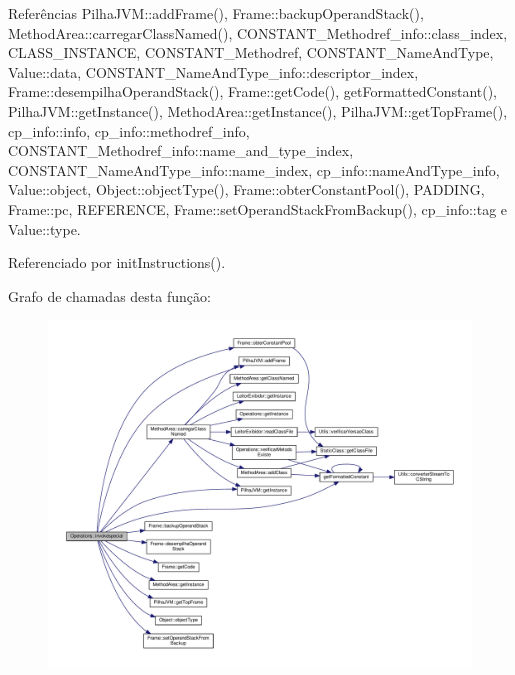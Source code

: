 Referências Pilha\+J\+V\+M\+::add\+Frame(), Frame\+::backup\+Operand\+Stack(), Method\+Area\+::carregar\+Class\+Named(), C\+O\+N\+S\+T\+A\+N\+T\+\_\+\+Methodref\+\_\+info\+::class\+\_\+index, C\+L\+A\+S\+S\+\_\+\+I\+N\+S\+T\+A\+N\+CE, C\+O\+N\+S\+T\+A\+N\+T\+\_\+\+Methodref, C\+O\+N\+S\+T\+A\+N\+T\+\_\+\+Name\+And\+Type, Value\+::data, C\+O\+N\+S\+T\+A\+N\+T\+\_\+\+Name\+And\+Type\+\_\+info\+::descriptor\+\_\+index, Frame\+::desempilha\+Operand\+Stack(), Frame\+::get\+Code(), get\+Formatted\+Constant(), Pilha\+J\+V\+M\+::get\+Instance(), Method\+Area\+::get\+Instance(), Pilha\+J\+V\+M\+::get\+Top\+Frame(), cp\+\_\+info\+::info, cp\+\_\+info\+::methodref\+\_\+info, C\+O\+N\+S\+T\+A\+N\+T\+\_\+\+Methodref\+\_\+info\+::name\+\_\+and\+\_\+type\+\_\+index, C\+O\+N\+S\+T\+A\+N\+T\+\_\+\+Name\+And\+Type\+\_\+info\+::name\+\_\+index, cp\+\_\+info\+::name\+And\+Type\+\_\+info, Value\+::object, Object\+::object\+Type(), Frame\+::obter\+Constant\+Pool(), P\+A\+D\+D\+I\+NG, Frame\+::pc, R\+E\+F\+E\+R\+E\+N\+CE, Frame\+::set\+Operand\+Stack\+From\+Backup(), cp\+\_\+info\+::tag e Value\+::type.



Referenciado por init\+Instructions().

Grafo de chamadas desta função\+:\nopagebreak
\begin{figure}[H]
\begin{center}
\leavevmode
\includegraphics[width=350pt]{classOperations_ab561e27c8450ceec7e4f8b0a155fcda3_cgraph}
\end{center}
\end{figure}
\mbox{\label{classOperations_a562d8c9cc5975de2ee6d1a95e1969724}} 
